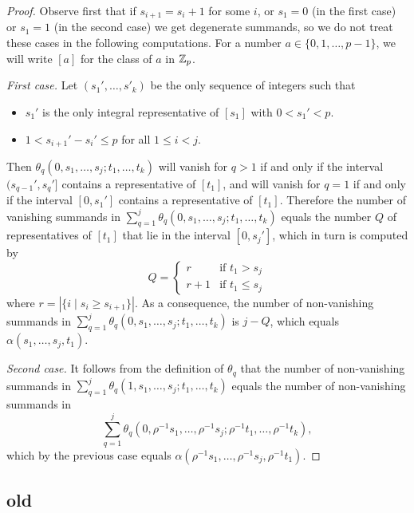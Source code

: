 \begin{proof}
	Observe first that if $s_{i+1} = s_i+1$ for some $i$, or $s_1 = 0$ (in the first case) or $s_1=1$ (in the second case) we get degenerate summands, so we do not treat these cases in the following computations. For a number $a\in \{0,1,\ldots,p-1\}$, we will write $[a]$ for the class of $a$ in $\mathbb{Z}_{p}$.

	{\em First case.} Let $(s_1',\ldots,s'_k)$ be the only sequence of integers such that
	\begin{itemize}
		\item $s_1'$ is the only integral representative of $[s_1]$ with $0< s_1'< p$.
		\item $1<s_{i+1}'-s_i'\leq p$ for all $1\leq i<j$.
	\end{itemize}
	Then $\theta_q(0,s_1,\ldots,s_j;t_1,\ldots,t_k)$ will vanish for $q>1$ if and only if the interval $(s_{q-1}',s_q']$ contains a representative of $[t_1]$, and will vanish for $q=1$ if and only if the interval $[0,s_1']$ contains a representative of $[t_1]$. Therefore the number of vanishing summands in $\sum_{q=1}^j\theta_q(0,s_1,\ldots,s_j;t_1,\ldots,t_k)$ equals the number $Q$ of representatives of $[t_1]$ that lie in the interval $[0,s_j']$, which in turn is computed by
	\[
	Q = \begin{cases}
		r & \text{if $t_1>s_j$} \\
		r+1 & \text{if $t_1\leq s_j$}
	\end{cases}
	\]
	where $r = |\{i\mid s_i\geq s_{i+1}\}|$. As a consequence, the number of non-vanishing summands in $\sum_{q=1}^j\theta_q(0,s_1,\ldots,s_j;t_1,\ldots,t_k)$ is $j-Q$, which equals $\alpha(s_1,\ldots,s_j,t_1)$.

	{\em Second case.} It follows from the definition of $\theta_q$ that the number of non-vanishing summands in $\sum_{q=1}^j \theta_q(1,s_1,\ldots,s_j;t_1,\ldots,t_k)$ equals the number of non-vanishing summands in
	\[\sum_{q=1}^j \theta_q(0,\rho^{-1}s_1,\ldots,\rho^{-1}s_j;\rho^{-1}t_1,\ldots,\rho^{-1}t_k),\] which by the previous case equals $\alpha(\rho^{-1}s_1,\ldots,\rho^{-1}s_j,\rho^{-1}t_1)$.%
\end{proof}

\subsection*{old}

